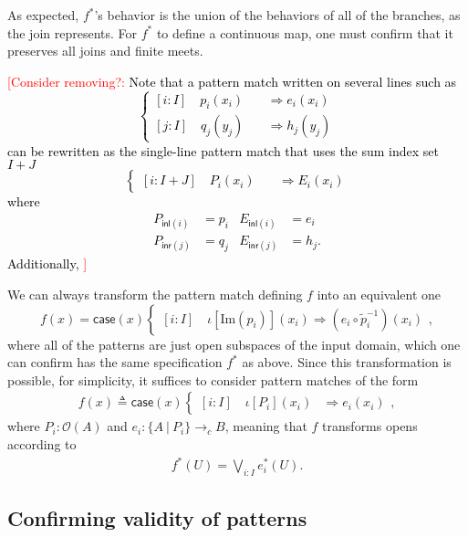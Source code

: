 \documentclass[conference]{IEEEtran}
\newcommand{\cto}{\to_c}
\newcommand{\suchthat}{\ |\ }
\newcommand{\Open}[1]{\mathcal{O}({#1})}
\newcommand{\Img}[1]{\text{Im}\left({#1}\right)}
\newcommand{\oinclf}[1]{\iota[{#1}]}
\newcommand{\oincl}[2]{\oinclf{#1} \left({#2}\right)}
\newcommand{\Branch}{\Rightarrow}
\newcommand{\iimg}[1]{#1^*}
\newcommand{\ConsiderRemoving}[1]{\textcolor{red}{[Consider removing?: \textcolor{black}{#1}]}}
\begin{document}
As expected, $\iimg{f}$'s behavior is the union of the behaviors of all of the branches, as the join represents. For $\iimg{f}$ to define a continuous map, one must confirm that it preserves all joins and finite meets.

\ConsiderRemoving{Note that a pattern match written on several lines such as
\[
\begin{cases}
[i : I] \quad p_i(x_i) \quad &\Branch e_i(x_i)
\\ [j : I] \quad q_j(y_j) \quad &\Branch h_j(y_j)
\end{cases}
\]
can be rewritten as the single-line pattern match that uses the sum index set $I + J$
\[
\begin{cases}
[i : I + J] \quad P_i(x_i) \quad &\Branch E_i(x_i)
\end{cases}
\]
where
\begin{align*}
P_{\mathsf{inl}(i)} &= p_i
& E_{\mathsf{inl}(i)} &= e_i
\\ P_{\mathsf{inr}(j)} &= q_j
& E_{\mathsf{inr}(j)} &= h_j.
\end{align*}
Additionally,
}


We can always transform the pattern match defining $f$ into an equivalent one
\[
f(x) = \mathsf{case}(x)
\begin{cases}
[i : I] \quad \oincl{\Img{p_i}}{x_i} \Branch (e_i \circ \tilde{p}_i^{-1})(x_i)
\end{cases},
\]
where all of the patterns are just open subspaces of the input domain, which one can confirm has the same specification $\iimg{f}$ as above. Since this transformation is possible, for simplicity, it suffices to consider pattern matches of the form
\begin{align}
\label{eq:pattern}
f(x) \triangleq \mathsf{case}(x)
\begin{cases}
[i : I] \quad \oincl{P_i}{x_i} &\Branch e_i(x_i)
\end{cases},
\end{align}
where $P_i : \Open{A}$ and $e_i : \{ A \suchthat P_i \} \cto B$, meaning that $f$ transforms opens according to
\begin{align}
\label{eq:iimg}
\iimg{f}(U) = \bigvee_{i : I} \iimg{e_i}(U).
\end{align}

\subsection{Confirming validity of patterns}
\end{document}
